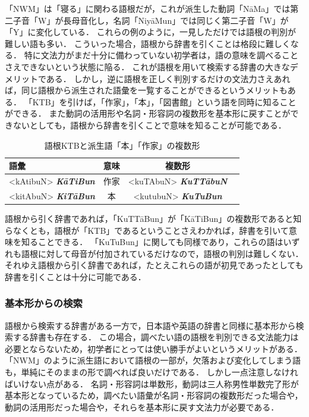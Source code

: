 \documentclass[technicalreport]{ieicej}
\begin{document}
「NWM」は「寝る」に関わる語根だが，これが派生した動詞「N\=aMa」では第二子音「W」が長母音化し，名詞「Niy\=aMun」では同じく第二子音「W」が「Y」に変化している．
これらの例のように，一見しただけでは語根の判別が難しい語も多い．
こういった場合，語根から辞書を引くことは格段に難しくなる．
特に文法力がまだ十分に備わっていない初学者は，語の意味を調べることさえできないという状態に陥る．
これが語根を用いて検索する辞書の大きなデメリットである．
しかし，逆に語根を正しく判別するだけの文法力さえあれば，同じ語根から派生された語彙を一覧することができるというメリットもある．
「KTB」を引けば，「作家」，「本」，「図書館」という語を同時に知ることができる．
また動詞の活用形や名詞・形容詞の複数形を基本形に戻すことができないとしても，語根から辞書を引くことで意味を知ることが可能である．

\begin{table}[ht]
\begin{center}
\begin{tabular}{l|ccc}
   語彙 & 意味 & 複数形\\
  \hline
  <kAtibuN> \textit{\textbf{K\=aTiBun}} & 作家 & <kuTAbuN> \textit{\textbf{KuTT\=abuN}}\\
  <kitAbuN> \textit{\textbf{KiT\=aBun}} & 本 & <kutubuN> \textit{\textbf{KuTuBun}}\\
\hline
\end{tabular}
\caption{語根KTBと派生語「本」「作家」の複数形}
\label{table:alignment}
\end{center}
\end{table}

語根から引く辞書であれば，「KuTTāBun」が「KāTiBun」の複数形であると知らなくとも，語根が「KTB」であるということさえわかれば，辞書を引いて意味を知ることできる．
「KuTuBun」に関しても同様であり，これらの語はいずれも語根に対して母音が付加されているだけなので，語根の判別は難しくない．
それゆえ語根から引く辞書であれば，たとえこれらの語が初見であったとしても辞書を引くことは十分に可能である．

\subsubsection{基本形からの検索}
語根から検索する辞書がある一方で，日本語や英語の辞書と同様に基本形から検索する辞書も存在する．
この場合，調べたい語の語根を判別できる文法能力は必要とならないため，初学者にとっては使い勝手がよいというメリットがある．
「NWM」のように派生語において語根の一部が，欠落および変化してしまう語も，単純にそのままの形で調べれば良いだけである．
しかし一点注意しなければいけない点がある．
名詞・形容詞は単数形，動詞は三人称男性単数完了形が基本形となっているため，調べたい語彙が名詞・形容詞の複数形だった場合や，動詞の活用形だった場合や，それらを基本形に戻す文法力が必要である．
\end{document}
